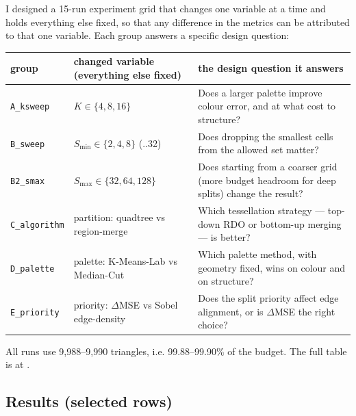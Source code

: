\documentclass[11pt,a4paper]{article}
\begin{document}
I designed a 15-run experiment grid that changes one variable at a time and
holds everything else fixed, so that any difference in the metrics can be
attributed to that one variable. Each group answers a specific design question:

\begin{table}[htbp]
\centering
\footnotesize
\begin{tabularx}{\textwidth}{@{}l Y Y@{}}
\toprule
\textbf{group} & \textbf{changed variable (everything else fixed)} & \textbf{the design question it answers}\\
\midrule
\texttt{A\_ksweep}   & $K \in \{4, 8, 16\}$ & Does a larger palette improve colour error, and at what cost to structure?\\
\texttt{B\_sweep}    & $S_{\min} \in \{2, 4, 8\}$ (..32) & Does dropping the smallest cells from the allowed set matter?\\
\texttt{B2\_smax}    & $S_{\max} \in \{32, 64, 128\}$ & Does starting from a coarser grid (more budget headroom for deep splits) change the result?\\
\texttt{C\_algorithm}& partition: quadtree vs region-merge & Which tessellation strategy --- top-down RDO or bottom-up merging --- is better?\\
\texttt{D\_palette}  & palette: K-Means-Lab vs Median-Cut & Which palette method, with geometry fixed, wins on colour and on structure?\\
\texttt{E\_priority} & priority: $\Delta$MSE vs Sobel edge-density & Does the split priority affect edge alignment, or is $\Delta$MSE the right choice?\\
\bottomrule
\end{tabularx}
\end{table}

All runs use 9{,}988--9{,}990 triangles, i.e. 99.88--99.90\% of the budget. The
full table is at .

\FloatBarrier
\FloatBarrier
\subsection{Results (selected rows)}
\label{sec:t3-results}
\end{document}

